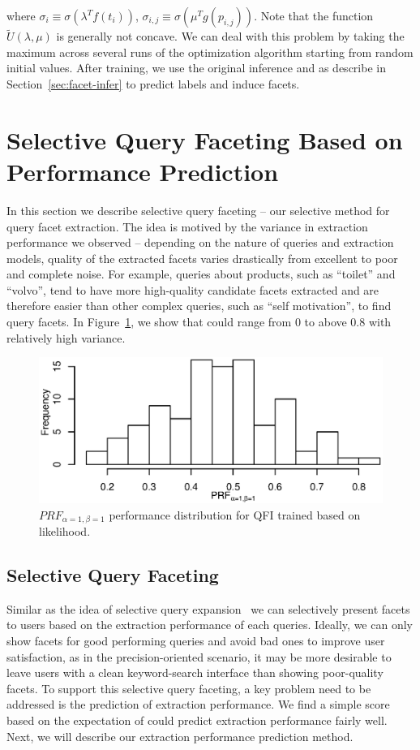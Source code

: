 where $\sigma_i\equiv \sigma(\lambda^T f(t_i))$, $\sigma_{i,j}\equiv \sigma(\mu^T g(p_{i,j}))$. Note that the function $\widetilde{U}(\lambda,\mu)$ is generally not concave. We can deal with this problem by taking the maximum across several runs of the optimization algorithm starting from random initial values. %
After training, we use the original inference \QFI and \QFJ as describe in Section~\ref{sec:facet-infer} to predict labels and induce facets. %


\section{Selective Query Faceting Based on Performance Prediction}
\label{sec:precision-selective}
In this section we describe selective query faceting -- our selective method for query facet extraction. The idea is motived by the variance in extraction performance we observed -- depending on the nature of queries and extraction models, quality of the extracted facets varies drastically from excellent to poor and complete noise.  For example, queries about products, such as ``toilet'' and ``volvo'', tend to have more high-quality candidate facets extracted and are therefore easier than other complex queries, such as ``self motivation'', to find query facets. In Figure~\ref{fig:prf-hist}, we show that \PRF could range from 0 to above 0.8 with relatively high variance.
\begin{figure}[ht!]
\centering
\caption{$P\!R\!F_{\alpha=1,\beta=1}$ performance distribution for QFI trained based on likelihood.}
\label{fig:prf-hist}
\includegraphics[width=0.8\columnwidth]{figure/qf13-qp-prf.eps}
\end{figure}

\subsection{Selective Query Faceting}
Similar as the idea of selective query expansion~\cite{yom2005learning,amati2004query} we can selectively present facets to users based on the extraction performance of each queries. Ideally, we can only show facets for good performing queries and avoid bad ones to improve user satisfaction, as in the precision-oriented scenario, it may be more desirable to leave users with a clean keyword-search interface than showing poor-quality facets. To support this selective query faceting, a key problem need to be addressed is the prediction of extraction performance. We find a simple score based on the expectation of \PRF could predict extraction performance fairly well. Next, we will describe our extraction performance prediction method.


